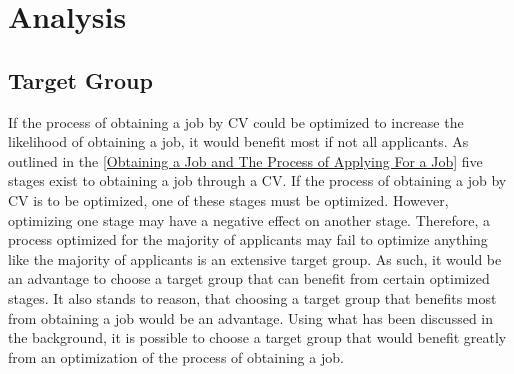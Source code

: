 \section{Analysis}\label{sec:analysis}

\subsection{Target Group}
If the process of obtaining a job by CV could be optimized to increase the likelihood of obtaining a job, it would benefit most if not all applicants.
As outlined in the \ref{Obtaining a Job and The Process of Applying For a Job} five stages exist to obtaining a job through a CV.
If the process of obtaining a job by CV is to be optimized, one of these stages must be optimized. 
However, optimizing one stage may have a negative effect on another stage.
Therefore, a process optimized for the majority of applicants may fail to optimize anything like the majority of applicants is an extensive target group.
As such, it would be an advantage to choose a target group that can benefit from certain optimized stages.
It also stands to reason, that choosing a target group that benefits most from obtaining a job would be an advantage.
Using what has been discussed in the background, it is possible to choose a target group that would benefit greatly from an optimization of the process of obtaining a job. \\

